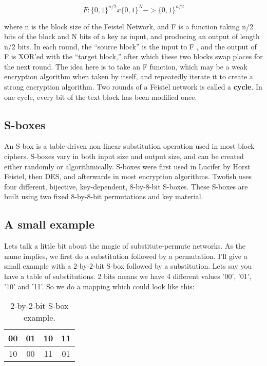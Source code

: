 \begin{equation*}
  F : \lbrace 0, 1\rbrace^{n/2} x \lbrace0, 1\rbrace^N -> \lbrace 0, 1\rbrace^{n/2}
\end{equation*}

where n is the block size of the Feistel Network, and F is a function taking n/2 bits of the block and N bits of a key as input, and producing an output of length n/2 bits. In each round, the “source block” is the input to F , and the output of F is XOR'ed with the “target block,” after which these two blocks swap places for the next round. The idea here is to take an F function, which may be a weak encryption algorithm when taken by itself, and repeatedly iterate it to create a strong encryption algorithm.  Two rounds of a Feistel network is called a \textbf{cycle}. In one cycle, every bit of the text block has been modified once.

\subsection{S-boxes}
An S-box is a table-driven non-linear substitution operation used in most block ciphers. S-boxes vary in both input size and output size, and can be created either randomly or algorithmically. S-boxes were first used in Lucifer by Horst Feistel, then DES, and afterwards in most encryption algorithms. Twofish uses four different, bijective, key-dependent, 8-by-8-bit S-boxes. These S-boxes are built using two fixed 8-by-8-bit permutations and key material.

\subsection{A small example}
Lets talk a little bit about the magic of substitute-permute networks. As the name implies, we first do a substitution followed by a permutation. I'll give a small example with a 2-by-2-bit S-box followed by a substitution.
Lets say you have a table of substitutions. 2 bits means we have 4 different values '00', '01', '10' and '11'.
So we do a mapping which could look like this:
\begin{table}[h!]
  \begin{center}
    \label{fig:small_subs_example}
    \begin{tabular}{|c|c|c|c|}
      \hline
      00 & 01 & 10 & 11 \\ \hline
      10 & 00 & 11 & 01 \\ \hline
    \end{tabular}
    \caption{2-by-2-bit S-box example.}
  \end{center}
\end{table}

